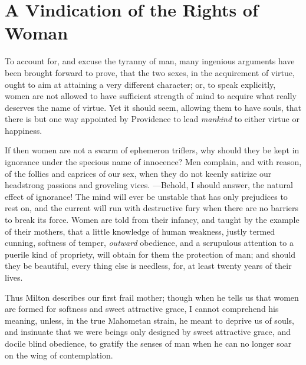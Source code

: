 
\author{Mary Wollstonecraft}
\chapter[A Vindication of the Rights of Woman, chap. 2]{A Vindication
of the Rights of Woman}


\noindent To account for, and excuse the tyranny of man, many
ingenious arguments have been brought forward to prove, that the two
sexes, in the acquirement of virtue, ought to aim at attaining a very
different character; or, to speak explicitly, women are not allowed to
have sufficient strength of mind to acquire what really deserves the
name of virtue. Yet it should seem, allowing them to have souls, that
there is but one way appointed by Providence to lead \textit{mankind}
to either virtue or happiness.

If then women are not a swarm of ephemeron triflers, why should they
be kept in ignorance under the specious name of innocence? Men
complain, and with reason, of the follies and caprices of our sex,
when they do not keenly satirize our headstrong passions and groveling
vices.  ---Be\-hold, I should answer, the natural effect of
ignorance! The mind will ever be unstable that has only prejudices to
rest on, and the current will run with destructive fury when there are
no barriers to break its force. Women are told from their infancy, and
taught by the example of their mothers, that a little knowledge of
human weakness, justly termed cunning, softness of temper,
\textit{outward} obedience, and a scrupulous attention to a puerile
kind of propriety, will obtain for them the protection of man; and
should they be beautiful, every thing else is needless, for, at least
twenty years of their lives.

Thus Milton describes our first frail mother; though when he tells us
that women are formed for softness and sweet attractive grace, I
cannot comprehend his meaning, unless, in the true Mahometan strain,
he meant to deprive us of souls, and insinuate that we were beings
only designed by sweet attractive grace, and docile blind obedience,
to gratify the senses of man when he can no longer soar on the wing of
contemplation.

